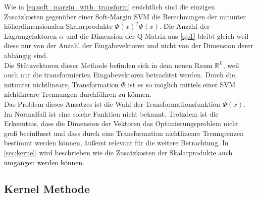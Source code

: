 \documentclass[a4paper,11pt,twoside]{scrreprt}
\begin{document}
Wie in \autoref{eq:soft_margin_with_transform} ersichtlich sind die einzigen Zusatzkosten gegenüber einer Soft-Margin \ac{SVM} die Berechnungen der mitunter höherdimensionalen Skalarprodukte $\Phi(x)^{T} \Phi(x)$. Die Anzahl der Lagrangefaktoren $\alpha$ und die Dimension der Q-Matrix aus \autoref{qp1} bleibt gleich weil diese nur von der Anzahl der Eingabevektoren und nicht von der Dimension derer abhängig sind. \\

Die Stützvektoren dieser Methode befinden sich in dem neuen Raum $\mathbb{R}^{L}$, weil auch nur die transformierten Eingabevektoren betrachtet werden. Durch die, mitunter nichtlineare, Transformation $\Phi$ ist es so möglich mittels einer \ac{SVM} nichtlineare Trennungen durchführen zu können. \\

Das Problem dieses Ansatzes ist die Wahl der Transformationsfunktion $\Phi(x)$. Im Normalfall ist eine solche Funktion nicht bekannt. Trotzdem ist die Erkenntnis, dass die Dimension der Vektoren das Optimierungsproblem nicht groß beeinflusst und dass durch eine Transformation nichtlineare Trenngrenzen bestimmt werden können, äußerst relevant für die weitere Betrachtung. In \autoref{sec:kernel} wird beschrieben wie die Zusatzkosten der Skalarprodukte auch umgangen werden können.

\subsection{Kernel Methode} \label{sec:kernel}



\nocite{*}

\clearpage
{}
{}
\printbibliography
\end{document}
